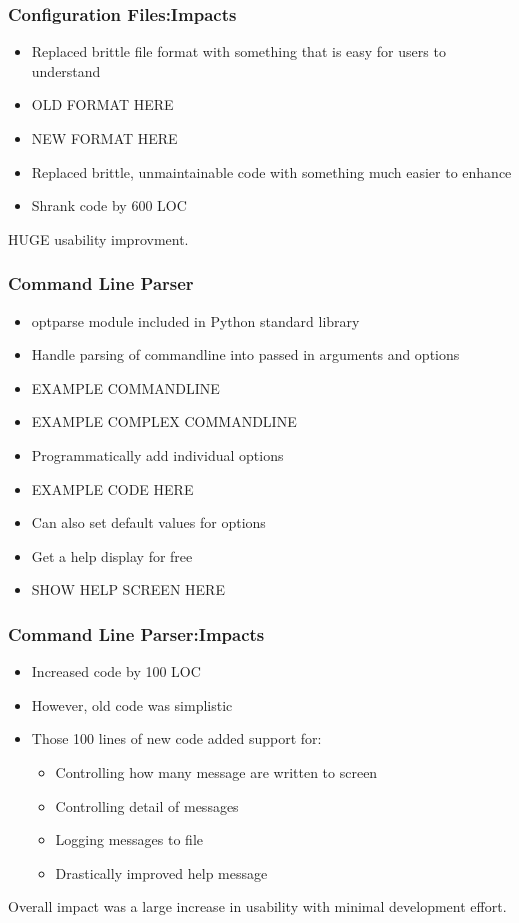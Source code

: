 \documentclass[red, hyperref={pdfpagelabels=false}]{beamer}
\begin{document}
\begin{frame}
  \frametitle{Configuration Files:Impacts}
  \begin{itemize}
    \item Replaced brittle file format with something that is easy for users to understand
    \item OLD FORMAT HERE
    \item NEW FORMAT HERE
    \item Replaced brittle, unmaintainable code with something much easier to enhance
    \item Shrank code by 600 LOC
  \end{itemize}
  HUGE usability improvment.
\end{frame}

\begin{frame}
  \frametitle{Command Line Parser}
  \begin{itemize}
    \item optparse module included in Python standard library
    \item Handle parsing of commandline into passed in arguments and options
    \item EXAMPLE COMMANDLINE
    \item EXAMPLE COMPLEX COMMANDLINE
    \item Programmatically add individual options
    \item EXAMPLE CODE HERE
    \item Can also set default values for options
    \item Get a help display for free
    \item SHOW HELP SCREEN HERE
  \end{itemize}
\end{frame}

\begin{frame}
  \frametitle{Command Line Parser:Impacts}
  \begin{itemize}
    \item Increased code by 100 LOC
    \item However, old code was simplistic
    \item Those 100 lines of new code added support for:
    \begin{itemize}
      \item Controlling how many message are written to screen
      \item Controlling detail of messages
      \item Logging messages to file
      \item Drastically improved help message
    \end{itemize}
  \end{itemize}
  Overall impact was a large increase in usability with minimal development effort.
\end{frame}
\end{document}
